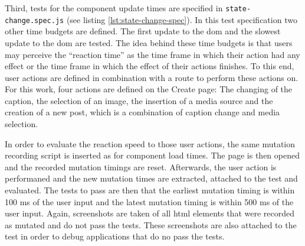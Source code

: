 \documentclass[a4paper, 10pt]{article}
\begin{document}
Third, tests for the component update times are specified in \verb|state-change.spec.js| (see listing \ref{lst:state-change-spec}).
In this test specification two other time budgets are defined.
The first update to the \acrshort{dom} and the slowest update to the \acrshort{dom} are tested.
The idea behind these time budgets is that users may perceive the \enquote{reaction time} as the time frame in which their action had any effect or the time frame in which the effect of their actions finishes.
To this end, user actions are defined in combination with a route to perform these actions on.
For this work, four actions are defined on the Create page: The changing of the caption, the selection of an image, the insertion of a media source and the creation of a new post, which is a combination of caption change and media selection.

In order to evaluate the reaction speed to those user actions, the same mutation recording script is inserted as for component load times.
The page is then opened and the recorded mutation timings are reset. Afterwards, the user action is performaned and the new mutation times are extracted, attached to the test and evaluated.
The tests to pass are then that the earliest mutation timing is within 100 ms of the user input and the latest mutation timing is within 500 ms of the user input.
Again, screenshots are taken of all \acrshort{html} elements that were recorded as mutated and do not pass the tests.
These screenshots are also attached to the test in order to debug applications that do no pass the tests.
\end{document}
